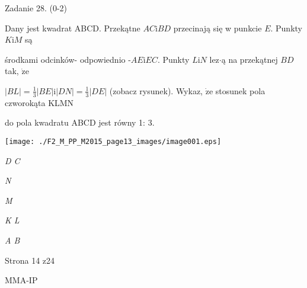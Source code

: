 \documentclass[a4paper,12pt]{article}
\begin{document}
Zadanie 28. (0-2)

Dany jest kwadrat ABCD. Przekątne $AC\mathrm{i}BD$ przecinają się w punkcie $E$. Punkty $K\mathrm{i}M$ są

środkami odcinków- odpowiednio -$AE\mathrm{i}EC$. Punkty $L\mathrm{i}N$ lez$\cdot$ą na przekątnej $BD$ tak, $\dot{\mathrm{z}}\mathrm{e}$

$|BL|=\displaystyle \frac{1}{3}|BE| \mathrm{i} |DN|=\displaystyle \frac{1}{3}|DE|$ (zobacz rysunek). Wykaz, $\dot{\mathrm{z}}\mathrm{e}$ stosunek pola czworokąta KLMN

do pola kwadratu ABCD jest równy 1: 3.
\begin{center}
\texttt{[image: ./F2\_M\_PP\_M2015\_page13\_images/image001.eps]}
\end{center}
{\it D  C}

{\it N}

{\it M}

{\it K  L}

{\it A  B}

Strona 14 z24

MMA-IP
\end{document}
